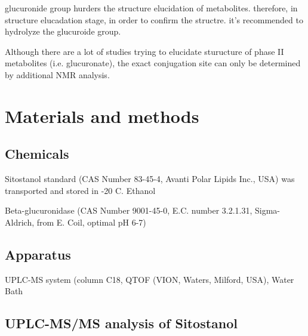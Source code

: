 glucuronide group hurders the structure elucidation of metabolites.
therefore, in structure elucadation stage, in order to confirm the structre. it's recommended to hydrolyze the glucuroide group.

Although there are a lot of studies trying to elucidate sturucture of phase II metabolites (i.e. glucuronate), the exact conjugation site can only be determined by additional NMR analysis. 
\section{Materials and methods}
\subsection{Chemicals}
Sitostanol standard (CAS Number 83-45-4, Avanti Polar Lipids Inc., USA) was transported and stored in -20 \degree C. Ethanol

Beta-glucuronidase (CAS Number 9001-45-0, E.C. number 3.2.1.31, Sigma-Aldrich, from E. Coil, optimal pH 6-7)

\subsection{Apparatus}
UPLC-MS system (column C18, QTOF (VION, Waters, Milford, USA), Water Bath


\subsection{UPLC-MS/MS analysis of Sitostanol}

